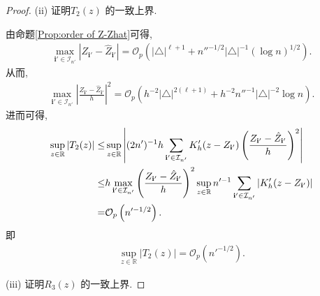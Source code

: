 \documentclass[a4paper,openay,14pt]{ctexbook}
\numberwithin{equation}{section}
\numberwithin{lem}{section}
\begin{document}
\begin{proof}
\medskip
\noindent

(ii) 证明$T_2(z)$ 的一致上界.

由命题\ref{Prop:order of Z-Zhat}可得,
        \begin{align*}
            \max_{\mathbf{i}'\in\mathcal{I}_{n'}}\left\vert Z_{\mathbf{i}'} - \hat{Z}_{\mathbf{i}'}\right\vert = \mathcal{O}_p\left(\vert\triangle\vert^{\ell+1}+n''^{-1/2}\vert\triangle\vert^{-1}(\log n)^{1/2}\right).
        \end{align*}
从而,
 \begin{align*}
            \max_{\mathbf{i}'\in\mathcal{I}_{n'}}\left\vert\frac{Z_{\mathbf{i}'}-\hat{Z}_{\mathbf{i}'}}{h}\right\vert^2 = \mathcal{O}_p\left(h^{-2}\vert\triangle\vert^{2(\ell+1)}+h^{-2}n''^{-1}\vert\triangle\vert^{-2}\log n\right).
        \end{align*}
进而可得,
         \begin{align}
            \sup_{z\in\mathbb{R}}\left\vert T_2(z)\right\vert 
            \leq &\sup_{z\in\mathbb{R}}\left\vert (2n')^{-1}h\sum_{\mathbf{i}'\in\mathcal{I}_{n'}}K_h'(z-Z_{\mathbf{i}'})\left(\frac{Z_{\mathbf{i}'}-\hat{Z}_{\mathbf{i}'}}{h}\right)^2\right\vert\notag\\
            \leq& h\max_{\mathbf{i}'\in\mathcal{I}_{n'}}\left(\frac{Z_{\mathbf{i}'}-\hat{Z}_{\mathbf{i}'}}{h}\right)^2\sup_{z\in\mathbb{R}}n'^{-1}\sum_{\mathbf{i}'\in\mathcal{I}_{n'}}\left\vert K_h'(z-Z_{\mathbf{i}'})\right\vert\notag\\
            =&\mathcal{O}_p\left(n'^{-1/2}\right)\notag.
        \end{align}
即
\begin{align}\label{OUTCOME:T2}
    \sup_{z\in\mathbb{R}}|T_2(z)|
    ={\scriptstyle\mathcal{O}}_p\left(n'^{-1/2}\right).
\end{align}

\medskip
\noindent

(iii) 证明$R_3(z)$ 的一致上界.


\end{proof}
\end{document}
